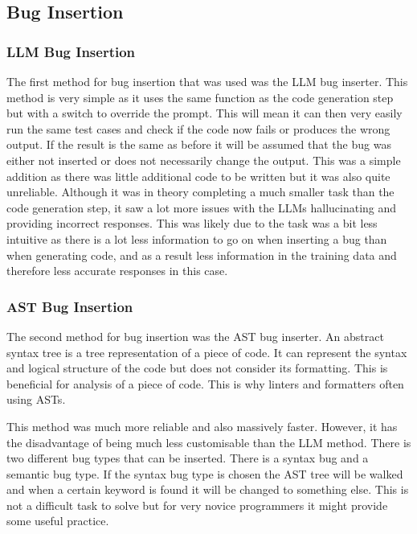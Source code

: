 \documentclass[12pt]{extarticle}
\begin{document}
\subsection{Bug Insertion}
\subsubsection{LLM Bug Insertion}

The first method for bug insertion that was used was the LLM bug inserter. This method is very simple as it uses the same function as the code generation step but with a switch to override the prompt. This will mean it can then very easily run the same test cases and check if the code now fails or produces the wrong output. If the result is the same as before it will be assumed that the bug was either not inserted or does not necessarily change the output. This was a simple addition as there was little additional code to be written but it was also quite unreliable. Although it was in theory completing a much smaller task than the code generation step, it saw a lot more issues with the LLMs hallucinating and providing incorrect responses. This was likely due to the task was a bit less intuitive as there is a lot less information to go on when inserting a bug than when generating code, and as a result less information in the training data and therefore less accurate responses in this case.

\subsubsection{AST Bug Insertion}

The second method for bug insertion was the AST bug inserter. An abstract syntax tree is a tree representation of a piece of code. It can represent the syntax and logical structure of the code but does not consider its formatting. This is beneficial for analysis of a piece of code. This is why linters and formatters often using ASTs.

This method was much more reliable and also massively faster. However, it has the disadvantage of being much less customisable than the LLM method. There is two different bug types that can be inserted. There is a syntax bug and a semantic bug type. If the syntax bug type is chosen the AST tree will be walked and when a certain keyword is found it will be changed to something else. This is not a difficult task to solve but for very novice programmers it might provide some useful practice.
\end{document}
